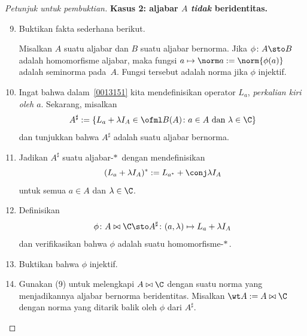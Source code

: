 \begin{proof}[\emph{Petunjuk untuk pembuktian}]
\noindent\textbf{Kasus 2: aljabar $A$ \emph{tidak} beridentitas.}
\begin{enumerate}
\setcounter{enumi}{8}
    \item Buktikan fakta sederhana berikut.
  \begin{lem} Misalkan $A$ suatu aljabar dan $B$ suatu aljabar bernorma. Jika
  $\phi\colon A \sto B$ adalah homomorfisme aljabar, maka fungsi
  $a \mapsto \norm a := \norm{\phi(a)}$ adalah seminorma pada~$A$. Fungsi tersebut adalah
  norma jika $\phi$ injektif.
  \end{lem}
    \item Ingat bahwa dalam~\ref{0013151} kita mendefinisikan operator $L_a$,
\emph{perkalian kiri oleh $a$}. Sekarang, misalkan
      \[ A^{\sharp} :=
        \{ L_a + \lambda I_A \in \ofml B(A)\colon a \in A \text{ dan } \lambda \in \C\} \]
dan tunjukkan bahwa $A^\sharp$ adalah suatu aljabar bernorma.
    \item Jadikan $A^\sharp$ suatu aljabar-$*\,$ dengan mendefinisikan
      \[ (L_a + \lambda I_A)^* := L_{a^*} + \conj\lambda I_A \]
untuk semua $a \in A$ dan $\lambda \in \C$.
    \item Definisikan
      \[ \phi\colon A \bowtie \C \sto A^\sharp\colon
                   (a,\lambda) \mapsto L_a + \lambda I_A \]
dan verifikasikan bahwa $\phi$ adalah suatu homomorfisme-$*\,$.
    \item Buktikan bahwa $\phi$ injektif.
    \item Gunakan (9) untuk melengkapi $A \bowtie \C$ dengan suatu norma yang
menjadikannya aljabar bernorma beridentitas. Misalkan $\wt A := A \bowtie \C$ dengan
    norma yang ditarik balik oleh $\phi$ dari $A^\sharp$.



\end{enumerate}
\end{proof}
